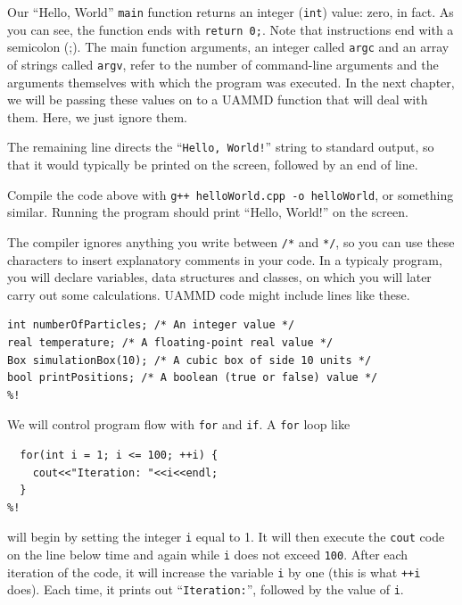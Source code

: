 Our ``Hello, World'' \texttt{main} function returns an integer (\texttt{int})
value: zero, in fact. As you can see, the function ends with \texttt{return 0;}.
Note that instructions end with a semicolon (;). The main function arguments, an
integer called \texttt{argc} and an array of strings called \texttt{argv}, refer
to the number of command-line arguments and the arguments themselves with which
the program was executed. In the next chapter, we will be passing these values
on to a UAMMD function that will deal with them. Here, we just ignore them.

The remaining line directs the ``\texttt{Hello, World!}'' string to standard
output, so that it would typically be printed on the screen, followed by an
end of line.

Compile the code above with \texttt{g++ helloWorld.cpp -o helloWorld}, or
something similar. Running the program should print ``Hello, World!'' on the
screen.

The compiler ignores anything you write between \texttt{/*} and \texttt{*/}, so
you can use these characters to insert explanatory comments in your code. In a
typicaly program, you will declare variables, data structures and classes, on
which you will later carry out some calculations. UAMMD code might include lines
like these.
\begin{lstlisting}
int numberOfParticles; /* An integer value */
real temperature; /* A floating-point real value */
Box simulationBox(10); /* A cubic box of side 10 units */
bool printPositions; /* A boolean (true or false) value */
%!
\end{lstlisting}

We will control program flow with \texttt{for} and \texttt{if}. A \texttt{for}
loop like
\begin{lstlisting}
  for(int i = 1; i <= 100; ++i) {
    cout<<"Iteration: "<<i<<endl;
  }
%!
\end{lstlisting}
will begin by setting the integer \texttt{i} equal to 1. It will then execute
the \texttt{cout} code on the line below time and again while \texttt{i} does
not exceed \texttt{100}. After each iteration of the code, it will increase the
variable \texttt{i} by one (this is what \texttt{++i} does). Each time, it
prints out ``\texttt{Iteration:}'', followed by the value of \texttt{i}.

